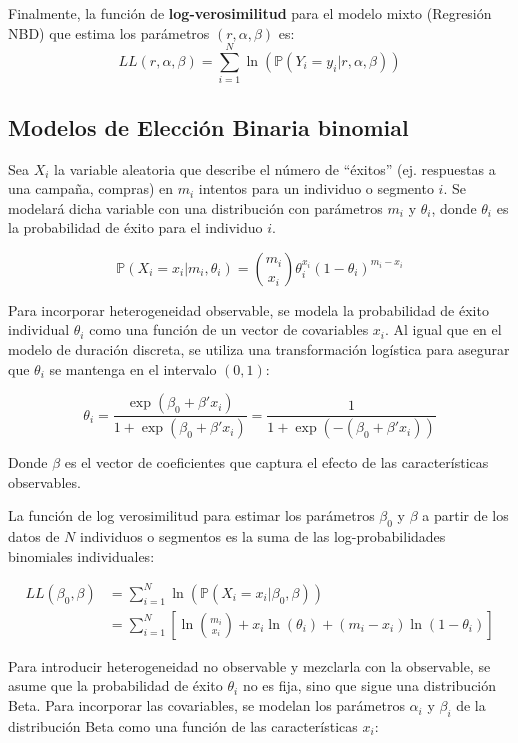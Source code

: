 \documentclass[
]{book}
\begin{document}
Finalmente, la función de \textbf{log-verosimilitud} para el modelo mixto
(Regresión NBD) que estima los parámetros \((r, \alpha, \beta)\) es: \[
LL(r, \alpha, \beta) = \sum_{i=1}^{N} \ln(\mathbb{P}(Y_i = y_i|r, \alpha, \beta))
\]

\subsection{Modelos de Elección Binaria binomial}\label{modelos-de-elecciuxf3n-binaria-binomial-1}

Sea \(X_i\) la variable aleatoria que describe el número de ``éxitos'' (ej.
respuestas a una campaña, compras) en \(m_i\) intentos para un individuo o
segmento \(i\). Se modelará dicha variable con una distribución con
parámetros \(m_i\) y \(\theta_i\), donde \(\theta_i\) es la probabilidad de
éxito para el individuo \(i\).

\[\mathbb{P}(X_i=x_i|m_i, \theta_i) = \binom{m_i}{x_i} \theta_i^{x_i}(1-\theta_i)^{m_i-x_i}\]

Para incorporar heterogeneidad observable, se modela la probabilidad de
éxito individual \(\theta_i\) como una función de un vector de covariables
\(x_i\). Al igual que en el modelo de duración discreta, se utiliza una
transformación logística para asegurar que \(\theta_i\) se mantenga en el
intervalo \((0,1)\):

\[\theta_i = \frac{\exp(\beta_0 + \beta'x_i)}{1 + \exp(\beta_0 + \beta'x_i)} = \frac{1}{1 + \exp(-(\beta_0 + \beta'x_i))}\]

Donde \(\beta\) es el vector de coeficientes que captura el efecto de las
características observables.

La función de log verosimilitud para estimar los parámetros \(\beta_0\) y
\(\beta\) a partir de los datos de \(N\) individuos o segmentos es la suma
de las log-probabilidades binomiales individuales:

\[
\begin{aligned}
LL(\beta_0, \beta) &= \sum_{i=1}^{N} \ln(\mathbb{P}(X_i=x_i|\beta_0, \beta)) \\
&= \sum_{i=1}^{N} \left[ \ln\binom{m_i}{x_i} + x_i \ln(\theta_i) + (m_i - x_i) \ln(1-\theta_i) \right]
\end{aligned}
\]

Para introducir heterogeneidad no observable y mezclarla con la
observable, se asume que la probabilidad de éxito \(\theta_i\) no es fija,
sino que sigue una distribución Beta. Para incorporar las covariables,
se modelan los parámetros \(\alpha_i\) y \(\beta_i\) de la distribución Beta
como una función de las características \(x_i\):
\end{document}
